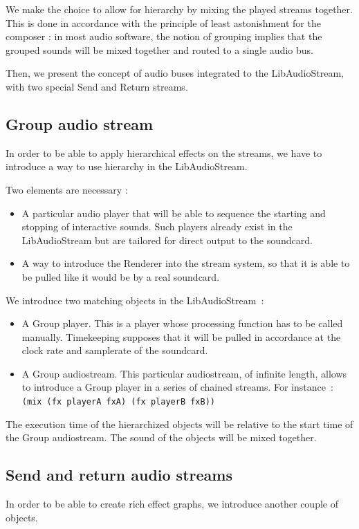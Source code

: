 \documentclass{article}
\begin{document}
We make the choice to allow for hierarchy by mixing the played streams together.
This is done in accordance with the principle of least astonishment\cite{seebach2001cranky} for the composer : 
in most audio software, the notion of grouping implies that the grouped sounds will be mixed 
together and routed to a single audio bus.

Then, we present the concept of audio buses integrated to the LibAudioStream,
with two special Send and Return streams.

\subsection{Group audio stream}
In order to be able to apply hierarchical effects on the streams, 
we have to introduce a way to use hierarchy in the LibAudioStream.

Two elements are necessary : 
\begin{itemize}
	\item A particular audio player that will be able to sequence the starting and stopping 
	of interactive sounds.
	Such players already exist in the LibAudioStream but are tailored for direct output to
	the soundcard.
	\item A way to introduce the Renderer into the stream system, so that it 
	is able to be pulled like it would be by a real soundcard.
\end{itemize}

We introduce two matching objects in the LibAudioStream~: 
\begin{itemize}
	\item A Group player. This is a player whose processing function has to be called manually. 
	Timekeeping supposes that it will be pulled in accordance at the clock rate
	and samplerate of the soundcard.
	\item A Group audiostream. This particular audiostream, of infinite length, 
	allows to introduce a Group player in a series of chained streams.
	For instance~:~\\\lstinline[language=LISP]{(mix (fx playerA fxA) (fx playerB fxB))}
\end{itemize}

The execution time of the hierarchized objects will be relative to the start time of the Group audiostream.
The sound of the objects will be mixed together.

\subsection{Send and return audio streams}
In order to be able to create rich effect graphs, we introduce another couple of objects.
\end{document}
